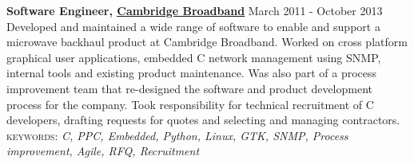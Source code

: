 \documentclass[10pt]{article}
\newcommand{\linkto}[2]{\href{#1}{\color{darkblue}\setulcolor{darkblue}\ul{#2}}}
\newcommand{\blankline}{\quad\pagebreak[2]}
\begin{document}
\blankline






\textbf{Software Engineer, \linkto{http://cbnl.com}{Cambridge Broadband} } \hfill March 2011 - October 2013 \\
Developed and maintained a wide range of software to enable and support a microwave backhaul product at Cambridge Broadband. Worked on cross platform graphical user applications, embedded C network management using SNMP, internal tools and existing product maintenance. Was also part of a process improvement team that re-designed the software and product development process for the company. Took responsibility for technical recruitment of C developers, drafting requests for quotes and selecting and managing contractors.  \\
{\small\textsc{keywords:} \emph{C, PPC, Embedded, Python, Linux, GTK, SNMP, Process improvement, Agile, RFQ, Recruitment}}

\blankline

\end{document}
